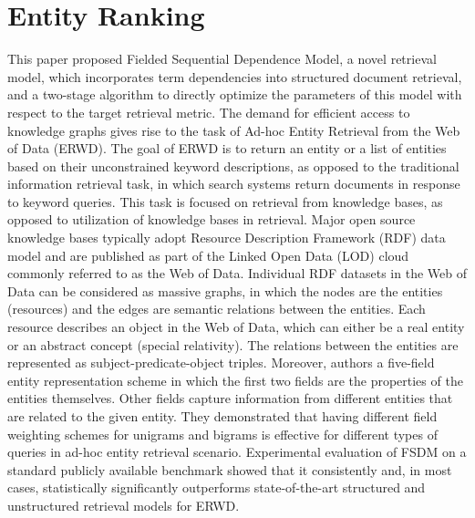 \documentclass[letterpaper,12pt]{article}
\begin{document}
\section{Entity Ranking}
This paper proposed Fielded Sequential Dependence Model,
a novel retrieval model, which incorporates term dependencies into structured document retrieval, and a two-stage algorithm to directly optimize the parameters of this model with respect to the target retrieval metric. The demand for efficient access to knowledge graphs gives rise to the task of Ad-hoc Entity Retrieval from the Web of Data (ERWD). The goal of ERWD is to return an entity or a list of entities based on their unconstrained keyword descriptions, as opposed to the traditional information retrieval task, in which search systems return documents in response to keyword queries. This task is focused on retrieval
from knowledge bases, as opposed to utilization of knowledge
bases in retrieval. Major open source knowledge bases typically adopt Resource Description Framework (RDF) data model and are published as part of the Linked Open Data (LOD) cloud commonly referred to as the Web of Data. Individual RDF datasets in the Web of Data can be considered as massive graphs, in which the nodes are the entities (resources) and the edges are semantic relations between the entities. Each resource describes an object in the Web of Data, which can either be a real entity or an abstract concept (special relativity). The relations between the entities are represented as subject-predicate-object triples. Moreover, authors a five-field entity representation scheme in which the first two fields are the properties of the entities themselves. Other fields capture information from different entities that are related to the given entity. They demonstrated that having different field weighting schemes for unigrams and bigrams is effective for different types of queries in ad-hoc entity retrieval scenario. Experimental
evaluation of FSDM on a standard publicly available benchmark showed that it consistently and, in most cases, statistically significantly outperforms state-of-the-art structured and unstructured retrieval models for ERWD.
\end{document}
